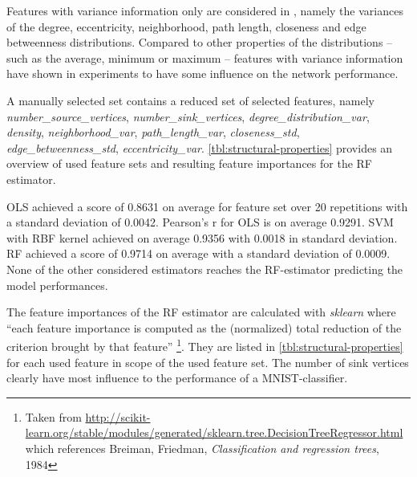 \documentclass[runningheads]{llncs}
\begin{document}
Features with variance information only are considered in , namely the variances of the degree, eccentricity, neighborhood, path length, closeness and edge betweenness distributions.
Compared to other properties of the distributions -- such as the average, minimum or maximum -- features with variance information have shown in experiments to have some influence on the network performance.

A manually selected set  contains a reduced set of selected features, namely \textit{number\_source\_vertices}, \textit{number\_sink\_vertices}, \textit{degree\_distribution\_var}, \textit{density}, \textit{neighborhood\_var}, \textit{path\_length\_var}, \textit{closeness\_std}, \textit{edge\_betweenness\_std}, \textit{eccentricity\_var}.
\autoref{tbl:structural-properties} provides an overview of used feature sets and resulting feature importances for the RF estimator.

OLS achieved a  score of 0.8631 on average for feature set  over 20 repetitions with a standard deviation of 0.0042.
Pearson's r for OLS is on average  0.9291.
SVM with RBF kernel achieved on average 0.9356 with 0.0018 in standard deviation.
RF achieved a  score of 0.9714 on average with a standard deviation of 0.0009.
None of the other considered estimators reaches the RF-estimator predicting the model performances.

The feature importances of the RF estimator are calculated with \textit{sklearn} \cite{sklearn2011} where ``each feature importance is computed as the (normalized) total reduction of the criterion brought by that feature'' \footnote{Taken from \url{http://scikit-learn.org/stable/modules/generated/sklearn.tree.DecisionTreeRegressor.html} which references Breiman, Friedman, \textit{Classification and regression trees}, 1984}.
They are listed in \autoref{tbl:structural-properties} for each used feature in scope of the used feature set.
The number of sink vertices clearly have most influence to the performance of a MNIST-classifier.
\end{document}
